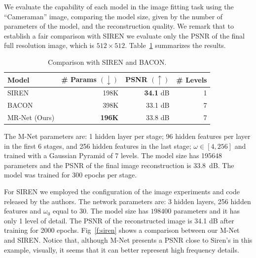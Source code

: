 We evaluate the capability of each model in the image fitting task using the ``Cameraman'' image, comparing the model size, given by the number of parameters of the model, and the reconstruction quality. We remark that to establish a fair comparison with SIREN we evaluate only the PSNR of the final full resolution image, which is $512\times 512$. Table~\ref{t:comp} summarizes the results.

\begin{table}[!h]
\centering
\small
\begin{tabular}{|l|r|r|r|}
\hline
Model & \# Params $(\downarrow)$ & PSNR $(\uparrow)$ & \# Levels \\
\hline
SIREN~\cite{sitzmann2019siren} & 198K & {\bf 34.1} dB & 1  \\
BACON~\cite{bacon2021} & 398K & 33.1 dB & 7 \\
MR-Net (Ours) & {\bf 196K} & 33.8 dB & 7  \\
\hline
\end{tabular}
\caption{\label{tab:comp} Comparison with SIREN and BACON.}
\label{t:comp}
\end{table}

The M-Net parameters are: 1 hidden layer per stage; 96 hidden features per layer in the first 6 stages, and 256 hidden features in the last stage; $\omega \in [4, 256]$ and trained with a Gaussian Pyramid of 7 levels. The model size has 195648 parameters and the PSNR of the final image reconstruction is 33.8~dB. The model was trained for 300 epochs per stage.

For SIREN we employed the configuration of the image experiments and code released by the authors. The network parameters are: 3 hidden layers, 256 hidden features and $\omega_0$ equal to 30. The model size has $198400$ parameters and it has only 1 level of detail. The PSNR of the reconstructed image is 34.1 dB after training for 2000 epochs. Fig~\ref{f:siren} shows a comparison between our M-Net and SIREN. Notice that, although M-Net presents a PSNR close to Siren's in this example, visually, it seems that it can better represent high frequency details.


